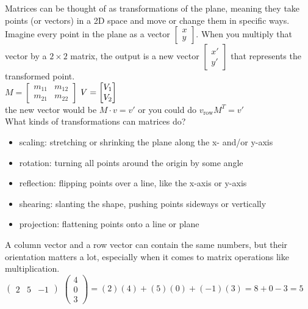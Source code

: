 \documentclass{article}
\begin{document}
Matrices can be thought of as transformations of the plane, meaning they take points (or vectors) in a 2D space and move or change them in specific ways. Imagine every point in the plane as a vector $
\begin{bmatrix}
x\\
y
\end{bmatrix}
$. When you multiply that vector by a $2 \times 2$ matrix, the output is a new vector $
\begin{bmatrix}
x'\\
y'
\end{bmatrix}$ that represents the transformed point.\\

$
M =
\begin{bmatrix}
	m_{11} & m_{12}\\
	m_{21} & m_ {22}
\end{bmatrix}
$
$
V =
\begin{bmatrix}
V_1 \\
V_2
\end{bmatrix}\\
$\\

the new vector would be $M \cdot v = v'$ or you could do $v_{\text{row}}M^T = v'$\\

What kinds of transformations can matrices do?
	\begin{itemize}
		\item scaling: stretching or shrinking the plane along the x- and/or y-axis
		\item rotation: turning all points around the origin by some angle
		\item reflection: flipping points over a line, like the x-axis or y-axis
		\item shearing: slanting the shape, pushing points sideways or vertically
		\item projection: flattening points onto a line or plane
	\end{itemize}

A column vector and a row vector can contain the same numbers, but their orientation matters a lot, especially when it comes to matrix operations like multiplication.\\

$
\begin{pmatrix}
2 & 5 & -1
\end{pmatrix}
$
$
\begin{pmatrix}
4\\
0\\
3
\end{pmatrix}
=
(2)(4) + (5)(0) + (-1)(3) = 8 + 0 - 3 = 5
$
\end{document}
